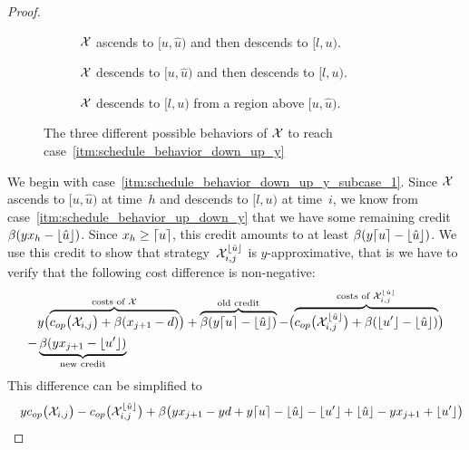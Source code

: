 \begin{proof}
\begin{figure}[H]
\renewcommand\thesubfigure{\roman{subfigure}}
\captionsetup[subfigure]{labelformat=parens}
\begin{subfigure}[b]{0.31\textwidth}

\caption{$\mathcal{X}$ ascends to $[u,\hat{u})$ and then descends to $[l,u)$.}
\end{subfigure}
\hfill
\begin{subfigure}[b]{0.31\textwidth}

\caption{$\mathcal{X}$ descends to $[u,\hat{u})$ and then descends to $[l,u)$.}
\end{subfigure}
\hfill
\begin{subfigure}[b]{0.31\textwidth}

\caption{$\mathcal{X}$ descends to $[l,u)$ from a region above $[u,\hat{u})$.}
\end{subfigure}
\caption{The three different possible behaviors of $\mathcal{X}$ to reach case~\ref{itm:schedule_behavior_down_up_y}}
\label{fig:schedule_behavior_down_up_y}
\end{figure}
We begin with case~\ref{itm:schedule_behavior_down_up_y_subcase_1}. Since $\mathcal{X}$ ascends to $[u,\hat{u})$ at time~$h$ and descends to $[l,u)$ at time~$i$, we know from case~\ref{itm:schedule_behavior_up_down_y} that we have some remaining credit $\beta(yx_h-\lfloor\hat{u}\rfloor)$. Since $x_h\ge\lceil u\rceil$, this credit amounts to at least $\beta(y\lceil u\rceil-\lfloor\hat{u}\rfloor)$. We use this credit to show that strategy~$\mathcal{X}_{i,j}^{\lfloor\hat{u}\rfloor}$ is $y$-approximative, that is we have to verify that the following cost difference is non-negative:
\begin{align*}
	&y\bigl(\overbrace{c_{op}\bigl(\mathcal{X}_{i,j}\bigr)+\beta(x_{j+1}-d)}^{\text{costs of }\mathcal{X}}\bigr)+\overbrace{\beta(y\lceil u\rceil-\lfloor\hat{u}\rfloor)}^{\text{old credit}}-\bigl(\overbrace{c_{op}\bigl(\mathcal{X}_{i,j}^{\lfloor\hat{u}\rfloor}\bigr)+\beta(\lfloor u'\rfloor-\lfloor\hat{u}\rfloor)}^{\text{costs of }\mathcal{X}_{i,j}^{\lfloor\hat{u}\rfloor}}\bigr)\\
	-&\underbrace{\beta(yx_{j+1}-\lfloor u'\rfloor)}_{\text{new credit}}
\end{align*}
This difference can be simplified to
\begin{align*}
	&&&y\opcosts\bigl(\mx_{i,j}\bigr)-\opcosts\bigl(\mx_{i,j}^{\floor{\hat{u}}}\bigr)+\beta\bigl(yx_{j+1}-yd+y\ceil{u}-\floor{\hat{u}}-\floor{u'}+\floor{\hat{u}}-yx_{j+1}+\floor{u'}\bigr)\\

\end{align*}
\end{proof}
